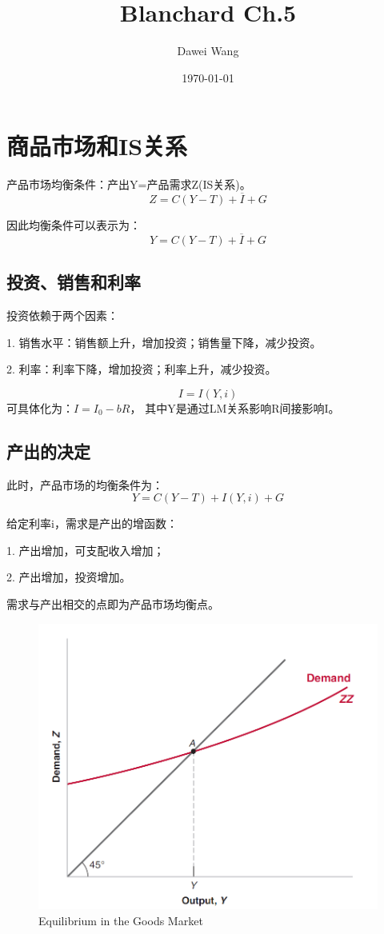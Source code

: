 \documentclass{article}
\title{Blanchard Ch.5}
\author{Dawei Wang}
\date{\today}
\begin{document}
	\maketitle
\section{商品市场和IS关系}
产品市场均衡条件：产出Y=产品需求Z(IS关系)。
\[
Z=C(Y-T)+\overline{I}+G
\]

因此均衡条件可以表示为：
\[
Y=C(Y-T)+\overline{I}+G
\]

\subsection{投资、销售和利率}
投资依赖于两个因素：

1. 销售水平：销售额上升，增加投资；销售量下降，减少投资。

2. 利率：利率下降，增加投资；利率上升，减少投资。

\hspace*{\fill}

\[
I=I(Y,i)
\]
可具体化为：$ I=I_0-bR $， 其中Y是通过LM关系影响R间接影响I。

\subsection{产出的决定}
此时，产品市场的均衡条件为：
\[
Y=C(Y-T)+I(Y,i)+G
\]

\hspace*{\fill}

给定利率i，需求是产出的增函数：

1. 产出增加，可支配收入增加；

2. 产出增加，投资增加。

需求与产出相交的点即为产品市场均衡点。

\begin{figure}[H] %
	\centering %
	\includegraphics[width=1\textwidth]{5_1} %
	\caption{Equilibrium in the Goods
		Market} %
	\label{Fig.main2} %
\end{figure}
\end{document}
